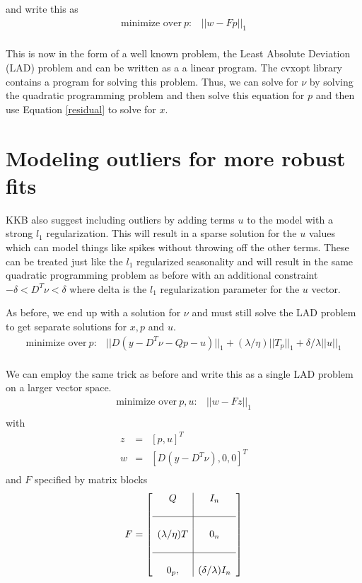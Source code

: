 \documentclass{article}
\begin{document}
and write this as
\begin{eqnarray}
\mbox{minimize over}~ p : & ||w-F p||_1 \\
\end{eqnarray}

This is now in the form of a well known problem, the Least Absolute Deviation (LAD) problem and can be written as a
a linear program. The cvxopt library contains a program for solving this problem. Thus,
we can solve for $\nu$ by solving the quadratic programming problem and then solve this equation for $p$ and then
use Equation \ref{residual} to solve for $x$.

\section{Modeling outliers for more robust fits}
KKB also suggest including outliers by adding terms $u$ to the model with a strong $l_1$ regularization. This will
result in a sparse solution for the $u$ values which can model things like spikes without throwing off the other terms.
These can be treated just like the $l_1$ regularized seasonality and will result in the same quadratic programming
problem as before with an additional constraint $-\delta < D^T \nu < \delta$ where delta is the $l_1$
regularization parameter for the $u$ vector.

As before, we end up with a solution for $\nu$ and must still solve the LAD problem to get separate solutions for
$x, p$ and $u$.
\begin{eqnarray}
\mbox{minimize over} ~p : & ||D (y - D^T \nu - Q p - u)||_1 + (\lambda / \eta) ||T_p||_1 + \delta/\lambda ||u||_1 \\
\end{eqnarray}

We can employ the same trick as before and write this as a single LAD problem on a larger vector space.
\begin{eqnarray}
\mbox{minimize over}~ p,u : & ||w-F z||_1 \\
\end{eqnarray}
with
\begin{eqnarray}
z & = & [p , u]^T\\
w & = & [D (y - D^T \nu), 0, 0]^T \\
\end{eqnarray}
and $F$ specified by matrix blocks
\begin{equation}
F=\left[
\begin{array}{c|c}
Q  & I_n   \\
\\
\hline
& \\
(\lambda/\eta) T & 0_n \\
\\
\hline
& \\
0_p, & (\delta/\lambda) I_n \\
\end{array}\right]
\end{equation}
\end{document}

